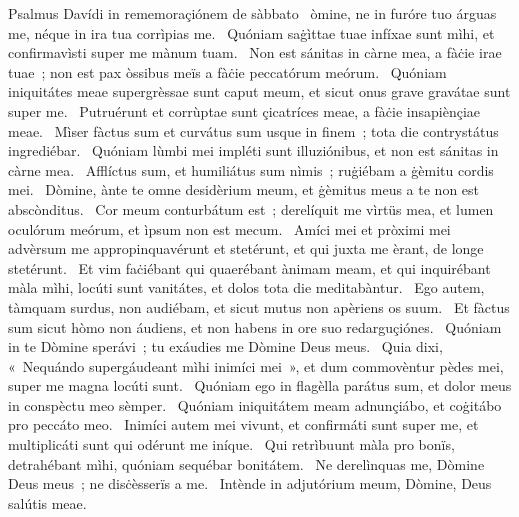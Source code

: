 { Psalmus Davídi in rememoraçiónem de sàbbato}
{%
~òmine, ne in furóre tuo árguas me, néque in ira tua corrìpias me. 
~Quóniam saġìttae tuae infíxae sunt mìhi, et confirmavìsti super me mànum tuam. 
~Non est sánitas in càrne mea, a fàċie irae tuae~; non est pax òssibus meïs a fàċie peccatórum meórum. 
~Quóniam iniquitátes meae supergrèssae sunt caput meum, et sicut onus grave gravátae sunt super me. 
~Putruérunt et corrùptae sunt çicatríces meae, a fàċie insapiènçiae meae. 
~Mìser fàctus sum et curvátus sum usque in finem~; tota die contrystátus ingrediébar. 
~Quóniam lùmbi mei impléti sunt illuziónibus, et non est sánitas in càrne mea. 
~Afflíctus sum, et humiliátus sum nìmis~; ruġiébam a ġèmitu cordis mei. 
~Dòmine, ànte te omne desidèrium meum, et ġèmitus meus a te non est abscònditus. 
~Cor meum conturbátum est~; derelíquit me vìrtüs mea, et lumen oculórum meórum, et ìpsum non est mecum. 
~Amíci mei et pròximi mei advèrsum me appropinquavérunt et stetérunt, et qui juxta me èrant, de longe stetérunt. 
~Et vim faċiébant qui quaerébant ànimam meam, et qui inquirébant màla mìhi, locúti sunt vanitátes, et dolos tota die meditabàntur. 
~Ego autem, tàmquam surdus, non audiébam, et sicut mutus non apèriens os suum. 
~Et fàctus sum sicut hòmo non áudiens, et non habens in ore suo redarguçiónes. 
~Quóniam in te Dòmine sperávi~; tu exáudies me Dòmine Deus meus. 
~Quia dixi, «~Nequándo supergáudeant mìhi inimíci mei~», et dum commovèntur pèdes mei, super me magna locúti sunt. 
~Quóniam ego in flagèlla parátus sum, et dolor meus in conspèctu meo sèmper. 
~Quóniam iniquitátem meam adnunçiábo, et coġitábo pro peccáto meo. 
~Inimíci autem mei vivunt, et confirmáti sunt super me, et multiplicáti sunt qui odérunt me iníque. 
~Qui retrìbuunt màla pro bonïs, detrahébant mìhi, quóniam sequébar bonitátem. 
~Ne derelìnquas me, Dòmine Deus meus~; ne disċèsserïs a me. 
~Intènde in adjutórium meum, Dòmine, Deus salútis meae. 
}
